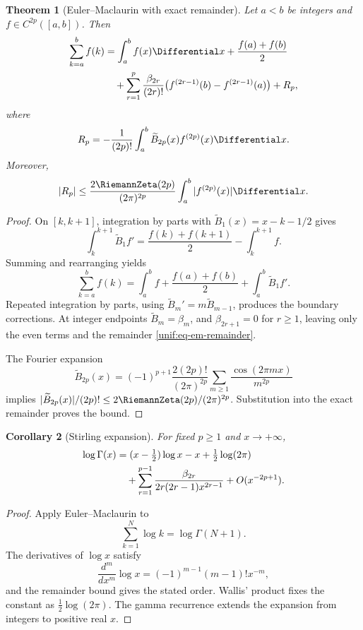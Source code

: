 \documentclass[11pt,a4paper,oneside,openany]{book}
\newtheorem{theorem}{Theorem}[chapter]
\newtheorem{corollary}[theorem]{Corollary}
\theoremstyle{definition}
\theoremstyle{remark}
\begin{document}
\begin{theorem}[Euler--Maclaurin with exact remainder]
\label{unif:thm-euler-maclaurin}
Let $a<b$ be integers and $f\in C^{2p}([a,b])$. Then
\begin{align}
 \sum_{k=a}^{b}f(k)
 &=\int_a^b f(x)\Differential x+\frac{f(a)+f(b)}2
 \notag\\
 &\quad+\sum_{r=1}^{p}\frac{\beta_{2r}}{(2r)!}
 \bigl(f^{(2r-1)}(b)-f^{(2r-1)}(a)\bigr)+R_p,
 \label{unif:eq-euler-maclaurin}
\end{align}
where
\begin{equation}\label{unif:eq-em-remainder}
 R_p=-\frac1{(2p)!}\int_a^b
 \widetilde B_{2p}(x)f^{(2p)}(x)\Differential x.
\end{equation}
Moreover,
\begin{equation}\label{unif:eq-em-bound}
 |R_p|\le\frac{2\RiemannZeta(2p)}{(2\pi)^{2p}}
 \int_a^b|f^{(2p)}(x)|\Differential x.
\end{equation}
\end{theorem}
\begin{proof}
On $[k,k+1]$, integration by parts with
$\widetilde B_1(x)=x-k-1/2$ gives
\[
 \int_k^{k+1}\widetilde B_1f'
 =\frac{f(k)+f(k+1)}2-\int_k^{k+1}f.
\]
Summing and rearranging yields
\[
 \sum_{k=a}^{b}f(k)=\int_a^bf+\frac{f(a)+f(b)}2
 +\int_a^b\widetilde B_1f'.
\]
Repeated integration by parts, using
$\widetilde B_m'=m\widetilde B_{m-1}$, produces the boundary corrections.
At integer endpoints $\widetilde B_m=\beta_m$, and
$\beta_{2r+1}=0$ for $r\ge1$, leaving only the even terms and the remainder
\eqref{unif:eq-em-remainder}.

The Fourier expansion
\[
 \widetilde B_{2p}(x)=(-1)^{p+1}\frac{2(2p)!}{(2\pi)^{2p}}
 \sum_{m\ge1}\frac{\cos(2\pi mx)}{m^{2p}}
\]
implies
$|\widetilde B_{2p}(x)|/(2p)!\le2\RiemannZeta(2p)/(2\pi)^{2p}$.
Substitution into the exact remainder proves the bound.
\end{proof}

\begin{corollary}[Stirling expansion]
For fixed $p\ge1$ and $x\to+\infty$,
\begin{align}
 \log\Gamma(x)
 &=(x-\tfrac12)\log x-x+\tfrac12\log(2\pi)
 \notag\\
 &\quad+\sum_{r=1}^{p-1}
 \frac{\beta_{2r}}{2r(2r-1)x^{2r-1}}+O(x^{-2p+1}).
 \label{unif:eq-stirling-expansion}
\end{align}
\end{corollary}
\begin{proof}
Apply Euler--Maclaurin to
\[
 \sum_{k=1}^{N}\log k=\log\Gamma(N+1).
\]
The derivatives of $\log x$ satisfy
\[
 \frac{d^m}{dx^m}\log x=(-1)^{m-1}(m-1)!x^{-m},
\]
and the remainder bound gives the stated order. Wallis' product fixes the
constant as $\frac12\log(2\pi)$. The gamma recurrence extends the
expansion from integers to positive real $x$.
\end{proof}
\end{document}
